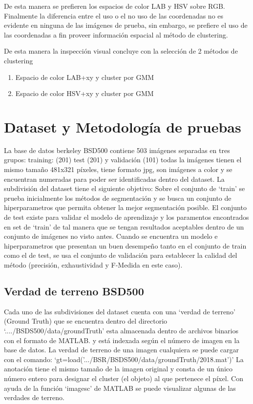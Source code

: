 \documentclass[10pt,twocolumn,letterpaper]{article}
\begin{document}
De esta manera se prefieren los espacios de color LAB y HSV sobre RGB. Finalmente la diferencia entre el uso o el no uso de las coordenadas no es evidente en ninguna de las imágenes de prueba, sin embargo, se prefiere el uso de las coordenadas a fin proveer información espacial al método de clustering.


De esta manera la inspección visual concluye con la selección de 2 métodos de clustering
\begin{enumerate}
	\item Espacio de color LAB+xy y cluster por GMM
	\item Espacio de color HSV+xy y cluster por GMM
\end{enumerate}



\section{Dataset y Metodología de pruebas}

La base de datos berkeley BSD500 contiene 503 imágenes  separadas en tres  grupos: training: (201) test (201) y validación (101) todas la imágenes tienen el mismo tamaño 481x321 píxeles, tiene formato jpg, son imágenes a color y se encuentran numeradas para poder ser identificadas dentro del dataset.
La subdivisión del dataset tiene el siguiente objetivo: Sobre el conjunto de ‘train’ se prueba inicialmente los métodos de segmentación y se busca un conjunto de  hiperparametros que permita obtener la mejor segmentación posible. El conjunto de test existe para validar el modelo de aprendizaje y los paramentos encontrados en set de ‘train’ de tal manera que se tengan resultados aceptables dentro de un conjunto de imágenes no visto antes. Cuando se encuentra un modelo e hiperparametros que presentan un buen desempeño tanto en el conjunto de train como el de test, se usa el conjunto de validación para establecer la calidad del método (precisión, exhaustividad y F-Medida en este caso).

\subsection{Verdad de terreno BSD500}

Cada uno de las subdivisiones del dataset cuenta con una ‘verdad de terreno’ (Ground Truth) que se encuentra dentro del directorio ‘..../BSDS500/data/groundTruth’ esta almacenada dentro de archivos binarios con el formato de MATLAB. y está indexada según el número de imagen en la base de datos.  La verdad de terreno de una imagen cualquiera se puede cargar con el comando:
‘gt=load('.../BSR/BSDS500/data/groundTruth/2018.mat')’
La anotación tiene el mismo tamaño de la imagen original y consta de un único número entero para designar el cluster (el objeto) al que pertenece el píxel. Con ayuda de la función ‘imagesc’ de MATLAB se puede visualizar algunas de las verdades de terreno.
\end{document}
